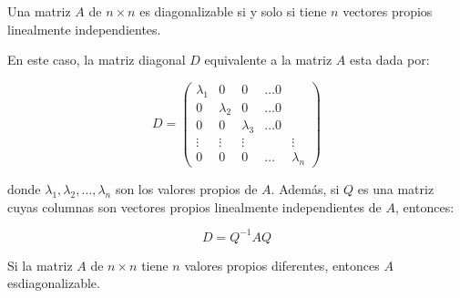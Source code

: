 		\begin{teorema}
			Una matriz $A$ de $n \times n$ es diagonalizable si y solo si tiene $n$ vectores propios linealmente independientes.

			En este caso, la matriz diagonal $D$ equivalente a la matriz $A$ esta dada por:

			\begin{equation}
				D =
				\begin{pmatrix}
					\lambda_1 & 0 & 0 & \dots 0 \\
					0 & \lambda_2 & 0 & \dots 0 \\
					0 & 0 & \lambda_3 & \dots 0 \\
					\vdots & \vdots & \vdots & & \vdots \\
					0 & 0 & 0 & \dots & \lambda_n
				\end{pmatrix}
			\end{equation}

			donde $\lambda_1, \lambda_2, \dots, \lambda_n$ son los valores propios de $A$.
			Además, si $Q$ es una matriz cuyas columnas son vectores propios linealmente independientes de $A$, entonces:

			\begin{equation}
				D = Q^{-1} A Q
			\end{equation}
		\end{teorema}

		\begin{corolario}
			Si la matriz $A$ de $n \times n$ tiene $n$ valores propios diferentes, entonces $A$ esdiagonalizable.
		\end{corolario}

